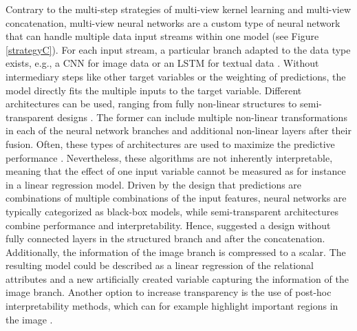 \documentclass[letterpaper]{article} %
\begin{document}
Contrary to the multi-step strategies of multi-view kernel learning and multi-view concatenation, multi-view neural networks are a custom type of neural network that can handle multiple data input streams within one model (see Figure \ref{strategyC}). For each input stream, a particular branch adapted to the data type exists, e.g., a CNN for image data or an LSTM for textual data \cite{li2018survey}. Without intermediary steps like other target variables or the weighting of predictions, the model directly fits the multiple inputs to the target variable. Different architectures can be used, ranging from fully non-linear structures to semi-transparent designs \cite{law2019take}. The former can include multiple non-linear transformations in each of the neural network branches and additional non-linear layers after their fusion. Often, these types of architectures are used to maximize the predictive performance \cite{law2019take}. Nevertheless, these algorithms are not inherently interpretable, meaning that the effect of one input variable cannot be measured as for instance in a linear regression model. Driven by the design that predictions are combinations of multiple combinations of the input features, neural networks are typically categorized as black-box models, while semi-transparent architectures combine performance and interpretability. Hence, \citeauthor{law2019take} suggested a design without fully connected layers in the structured branch and after the concatenation. Additionally, the information of the image branch is compressed to a scalar. The resulting model could be described as a linear regression of the relational attributes and a new artificially created variable capturing the information of the image branch. Another option to increase transparency is the use of post-hoc interpretability methods, which can for example highlight important regions in the image \cite{kucklick2020location}.
\end{document}

